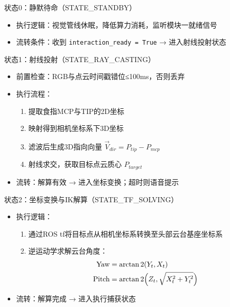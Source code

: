 \documentclass{beamer}
\begin{document}
    \begin{frame}{状态0：静默待命（STATE\_STANDBY）}
        \begin{itemize}
            \item 执行逻辑：视觉管线休眠，降低算力消耗，监听模块一就绪信号
            \item 流转条件：收到 \texttt{interaction\_ready = True} → 进入射线投射状态
        \end{itemize}
    \end{frame}

    \begin{frame}{状态1：射线投射（STATE\_RAY\_CASTING）}
        \begin{itemize}
            \item 前置检查：RGB与点云时间戳错位≤100ms，否则丢弃
            \item 执行流程：
            \begin{enumerate}
                \item 提取食指MCP与TIP的2D坐标
                \item 映射得到相机坐标系下3D坐标
                \item 滤波后生成3D指向向量 \( \vec{V}_{dir} = P_{tip} - P_{mcp} \)
                \item 射线求交，获取目标点云质心 \( P_{target} \)
            \end{enumerate}
            \item 流转：解算有效 → 进入坐标变换；超时则语音提示
        \end{itemize}
    \end{frame}

    \begin{frame}{状态2：坐标变换与IK解算（STATE\_TF\_SOLVING）}
        \begin{itemize}
            \item 执行逻辑：
            \begin{enumerate}
                \item 通过ROS tf将目标点从相机坐标系转换至头部云台基座坐标系
                \item 逆运动学求解云台角度：
                \[
                \begin{aligned}
                \text{Yaw} &= \arctan2(Y_t, X_t) \\
                \text{Pitch} &= \arctan2\Bigl(Z_t, \sqrt{X_t^2 + Y_t^2}\Bigr)
                \end{aligned}
                \]
            \end{enumerate}
            \item 流转：解算完成 → 进入执行捕获状态
        \end{itemize}
    \end{frame}
\end{document}
